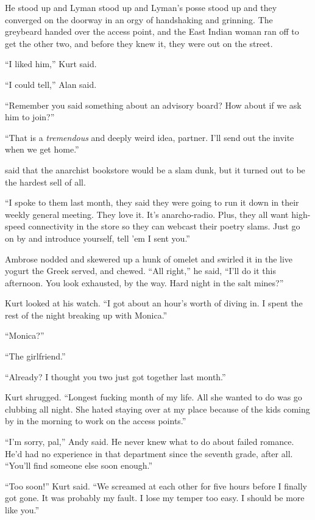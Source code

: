 He stood up and Lyman stood up and Lyman's posse stood up and they
converged on the doorway in an orgy of handshaking and grinning.  The
greybeard handed over the access point, and the East Indian woman ran
off to get the other two, and before they knew it, they were out on
the street.

``I liked him,'' Kurt said.

``I could tell,'' Alan said.

``Remember you said something about an advisory board?  How about if
we ask him to join?''

``That is a \textit{tremendous} and deeply weird idea, partner.  I'll
send out the invite when we get home.''

 said that the anarchist bookstore would be a slam dunk, but it
turned out to be the hardest sell of all.

``I spoke to them last month, they said they were going to run it down
in their weekly general meeting.  They love it.  It's anarcho-radio. 
Plus, they all want high-speed connectivity in the store so they can
webcast their poetry slams.  Just go on by and introduce yourself,
tell 'em I sent you.''

Ambrose nodded and skewered up a hunk of omelet and swirled it in the
live yogurt the Greek served, and chewed.  ``All right,'' he said,
``I'll do it this afternoon.  You look exhausted, by the way.  Hard
night in the salt mines?''

Kurt looked at his watch.  ``I got about an hour's worth of diving in. 
I spent the rest of the night breaking up with Monica.''

``Monica?''

``The girlfriend.''

``Already?  I thought you two just got together last month.''

Kurt shrugged.  ``Longest fucking month of my life.  All she wanted to
do was go clubbing all night.  She hated staying over at my place
because of the kids coming by in the morning to work on the access
points.''

``I'm sorry, pal,'' Andy said.  He never knew what to do about failed
romance.  He'd had no experience in that department since the seventh
grade, after all.  ``You'll find someone else soon enough.''

``Too soon!'' Kurt said.  ``We screamed at each other for five hours
before I finally got gone.  It was probably my fault.  I lose my
temper too easy.  I should be more like you.''

